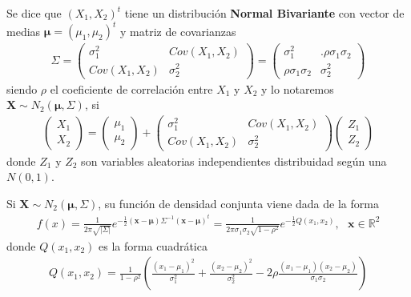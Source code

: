 \begin{defi}
    Se dice que $(X_1,X_2)^t$ tiene un distribución \textbf{Normal Bivariante} con vector de medias $\boldsymbol{\mu} = (\mu_1,\mu_2)^t$ y matriz de covarianzas
    \begin{align*}
        \Sigma =\left( \begin{matrix}
                           \sigma_1^2   & Cov(X_1,X_2) \\
                           Cov(X_1,X_2) & \sigma_2^2
                       \end{matrix}
        \right) = \left( \begin{matrix}
                             \sigma_1^2            & .\rho \sigma_1\sigma_2 \\
                             \rho \sigma_1\sigma_2 & \sigma_2^2
                         \end{matrix}
        \right)
    \end{align*}
    siendo $\rho$ el coeficiente de correlación entre $X_1$ y $X_2$ y lo notaremos $\textbf{X} \sim N_2(\boldsymbol{\mu}, \Sigma)$, si
    \begin{align*}
        \left( \begin{matrix}
                   X_1 \\
                   X_2
               \end{matrix}
        \right) = \left( \begin{matrix}
                             \mu_1 \\
                             \mu_2
                         \end{matrix}
        \right) + \left( \begin{matrix}
                             \sigma_1^2   & Cov(X_1,X_2) \\
                             Cov(X_1,X_2) & \sigma_2^2
                         \end{matrix}
        \right)\left( \begin{matrix}
                          Z_1 \\
                          Z_2
                      \end{matrix}
        \right)
    \end{align*}
    donde $Z_1$ y $Z_2$ son variables aleatorias independientes distribuidad según una $N(0,1)$.
\end{defi}
Si $\textbf{X} \sim N_2(\boldsymbol{\mu}, \Sigma)$, su función de densidad conjunta viene dada de la forma
\begin{align*}
    f(x) = \frac{1}{2\pi\sqrt{|\Sigma|}}e^{-\frac{1}{2}(\textbf{x} - \boldsymbol{\mu})\Sigma^{-1}(\textbf{x} - \boldsymbol{\mu})^t} = \frac{1}{2\pi\sigma_1\sigma_2\sqrt{1 - \rho^2}}e^{-\frac{1}{2}Q(x_1,x_2)}, \ \ \ \textbf{x} \in \mathbb{R}^2
\end{align*}
donde $Q(x_1,x_2)$ es la forma cuadrática
\begin{align*}
    Q(x_1,x_2) = \frac{1}{1 - \rho^2}\left( \frac{(x_1 - \mu_1)^2}{\sigma_1^2} + \frac{(x_2 - \mu_2)^2}{\sigma_2^2} - 2\rho\frac{(x_1 - \mu_1)(x_2 - \mu_2)}{\sigma_1\sigma_2}\right)
\end{align*}

